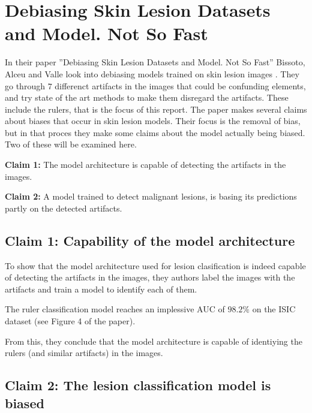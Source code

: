 \section{Debiasing Skin Lesion Datasets and Model. Not So Fast}
In their paper
''Debiasing Skin Lesion Datasets and Model. Not So Fast''
Bissoto, Alceu and Valle look into debiasing models trained on
skin lesion images \cite{debias-not-so-fast}.
They go through $7$ differenct artifacts in the images that could
be confunding elements, and try state of the art methods to
make them disregard the artifacts.
These include the rulers, that is the focus of this report.
The paper makes several claims about biases that occur in
skin lesion models.
Their focus is the removal of bias, but in that proces they
make some claims about the model actually being biased.
Two of these will be examined here.

\textbf{Claim 1:}
The model architecture is capable of detecting the artifacts in the images.

\textbf{Claim 2:}
A model trained to detect malignant lesions, is basing its predictions
partly on the detected artifacts.

\subsection{Claim 1: Capability of the model architecture}
To show that the model architecture used for lesion clasification is
indeed capable of detecting the artifacts in the images, they authors
label the images with the artifacts and train a model to identify
each of them.

The ruler classification model reaches an implessive AUC of $98.2\%$
on the ISIC dataset (see Figure 4 of the paper\cite{debias-not-so-fast}).

From this, they conclude that the model architecture is capable of identiying
the rulers (and similar artifacts) in the images.

\subsection{Claim 2: The lesion classification model is biased}


